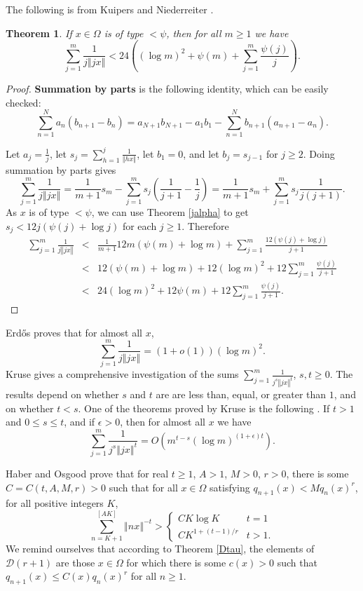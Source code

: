 \documentclass{amsart}
\newcommand{\norm}[1]{\left\Vert #1 \right\Vert}
\newtheorem{theorem}{Theorem}
\begin{document}
The following is from Kuipers and Niederreiter \cite[p.~131, Exercise 3.12]{kuipers}.

\begin{theorem}
If $x \in \Omega$ is of type $<\psi$, then for all $m \geq 1$ we have
\[
\sum_{j=1}^m \frac{1}{j\norm{jx}}<24\left((\log m)^2 + \psi(m)+\sum_{j=1}^m \frac{\psi(j)}{j} \right).
\]
\label{hhalpha}
\end{theorem}
\begin{proof}
\textbf{Summation by parts} is the following identity, which can be easily checked:
\[
\sum_{n=1}^N a_n(b_{n+1}-b_n)=a_{N+1}b_{N+1}-a_1 b_1 - \sum_{n=1}^N b_{n+1}(a_{n+1}-a_n).
\]

Let $a_j=\frac{1}{j}$, let $s_j=\sum_{h=1}^j \frac{1}{\norm{h x}}$, let $b_1=0$, and let $b_j=s_{j-1}$ for $j  \geq 2$. Doing summation by parts gives
\[
\sum_{j=1}^m  \frac{1}{j\norm{jx}}=\frac{1}{m+1} s_m-\sum_{j=1}^m s_j \left(\frac{1}{j+1}-\frac{1}{j}\right)
=\frac{1}{m+1} s_m+\sum_{j=1}^m s_j \frac{1}{j(j+1)}.
\]
As $x$ is of type $<\psi$, we can use Theorem \ref{jalpha} to get $s_j<12j(\psi(j)+\log j)$ for each $j \geq 1$. Therefore
\begin{eqnarray*}
\sum_{j=1}^m  \frac{1}{j\norm{jx}}&<&\frac{1}{m+1}12m(\psi(m)+\log m)+\sum_{j=1}^m \frac{12(\psi(j)+\log j)}{j+1}\\
&<&12(\psi(m)+\log m)+12 (\log m)^2+12\sum_{j=1}^m \frac{\psi(j)}{j+1}\\
&<&24(\log m)^2 + 12\psi(m)+12\sum_{j=1}^m \frac{\psi(j)}{j+1}.
\end{eqnarray*}
\end{proof}

Erd\H os \cite{remarks} proves that for almost all $x$,
\[
\sum_{j=1}^m \frac{1}{j\norm{jx}}=(1+o(1))(\log m)^2.
\]
Kruse \cite{MR0207642} gives a comprehensive investigation of the sums $\sum_{j=1}^m \frac{1}{j^s \norm{jx}^t}$, $s,t \geq 0$. The results depend on whether $s$ and $t$ are are less than, equal, or greater than $1$, and on whether $t<s$. One of the theorems proved by Kruse is the following \cite[p.~260, Theorem 7]{MR0207642}. If $t>1$ and $0 \leq s \leq t$, and if $\epsilon>0$, then for almost all $x$ we have
\[
\sum_{j=1}^m \frac{1}{j^s \norm{jx}^t} = O\left(m^{t-s} (\log m)^{(1+\epsilon)t} \right).
\]

Haber and Osgood  \cite[p.~387, Theorem 1]{haber} prove that for real $t \geq 1$, $A>1$, $M>0$, $r>0$, there is some $C=C(t,A,M,r)>0$ such that for
all $x \in \Omega$ satisfying $q_{n+1}(x)<M q_n(x)^r$, for all positive integers $K$,
\[
\sum_{n=K+1}^{[AK]} \norm{nx}^{-t} > \begin{cases}
CK \log K&t=1\\
CK^{1+(t-1)/r}&t>1.
\end{cases}
\]
We remind ourselves that according to Theorem \ref{Dtau}, the elements of $\mathcal{D}(r+1)$ are those
$x \in \Omega$ for which there is some $c(x)>0$ such that $q_{n+1}(x) \leq C(x) q_n(x)^r$ for all $n \geq 1$. 
\end{document}
